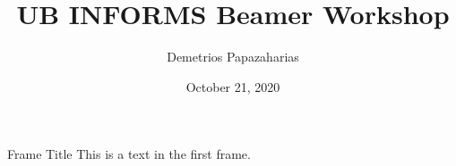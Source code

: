 \documentclass{beamer}
\title[Beamer Workshop]{UB INFORMS Beamer Workshop}
\author[Papazaharias, D.]{Demetrios Papazaharias\inst{1}}
\institute[UB]{\inst{1}University at Buffalo}
\date{October 21, 2020}
\begin{document}
\begin{frame}
    \maketitle
\end{frame}

\begin{frame}{Frame Title}
    This is a text in the first frame.
\end{frame}
    
\end{document}
